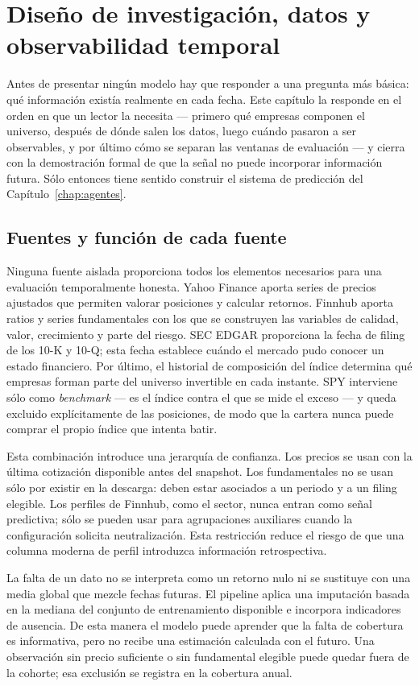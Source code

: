 \chapter{Diseño de investigación, datos y observabilidad temporal}
\label{chap:datos}

Antes de presentar ningún modelo hay que responder a una pregunta más básica: qué información existía
realmente en cada fecha. Este capítulo la responde en el orden en que un lector la necesita ---
primero qué empresas componen el universo, después de dónde salen los datos, luego cuándo pasaron a
ser observables, y por último cómo se separan las ventanas de evaluación --- y cierra con la
demostración formal de que la señal no puede incorporar información futura. Sólo entonces tiene
sentido construir el sistema de predicción del Capítulo~\ref{chap:agentes}.

\section{Fuentes y función de cada fuente}

Ninguna fuente aislada proporciona todos los elementos necesarios para una evaluación temporalmente
honesta. Yahoo Finance aporta series de precios ajustados que permiten valorar posiciones y calcular
retornos. Finnhub aporta ratios y series fundamentales con los que se construyen las variables de
calidad, valor, crecimiento y parte del riesgo. SEC EDGAR proporciona la fecha de filing de los
10-K y 10-Q; esta fecha establece cuándo el mercado pudo conocer un estado financiero. Por último,
el historial de composición del índice determina qué empresas forman parte del universo invertible
en cada instante. SPY interviene sólo como \textit{benchmark} --- es el índice contra el que se mide
el exceso --- y queda excluido explícitamente de las posiciones, de modo que la cartera nunca puede
comprar el propio índice que intenta batir.

Esta combinación introduce una jerarquía de confianza. Los precios se usan con la última cotización
disponible antes del snapshot. Los fundamentales no se usan sólo por existir en la descarga: deben
estar asociados a un periodo y a un filing elegible. Los perfiles de Finnhub, como el sector, nunca
entran como señal predictiva; sólo se pueden usar para agrupaciones auxiliares cuando la
configuración solicita neutralización. Esta restricción reduce el riesgo de que una columna moderna
de perfil introduzca información retrospectiva.

La falta de un dato no se interpreta como un retorno nulo ni se sustituye con una media global que
mezcle fechas futuras. El pipeline aplica una imputación basada en la mediana del conjunto de
entrenamiento disponible e incorpora indicadores de ausencia. De esta manera el modelo puede
aprender que la falta de cobertura es informativa, pero no recibe una estimación calculada con el
futuro. Una observación sin precio suficiente o sin fundamental elegible puede quedar fuera de la
cohorte; esa exclusión se registra en la cobertura anual.

